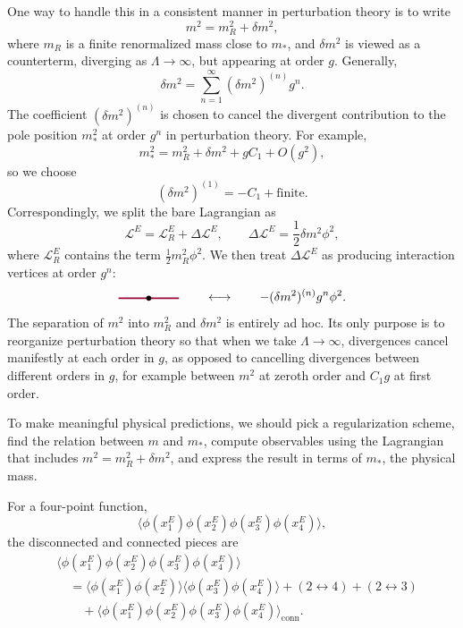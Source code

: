 One way to handle this in a consistent manner in perturbation theory is to
write
\[
  m^2=m_R^2+\delta m^2,
\]
where \(m_R\) is a finite renormalized mass close to \(m_*\), and
\(\delta m^2\) is viewed as a counterterm, diverging as
\(\Lambda\to\infty\), but appearing at order \(g\). Generally,
\[
  \delta m^2=\sum_{n=1}^{\infty}(\delta m^2)^{(n)}g^n .
\]
The coefficient \((\delta m^2)^{(n)}\) is chosen to cancel the divergent
contribution to the pole position \(m_*^2\) at order \(g^n\) in perturbation
theory. For example,
\[
  m_*^2=m_R^2+\delta m^2+gC_1+O(g^2),
\]
so we choose
\[
  (\delta m^2)^{(1)}=-C_1+\text{finite}.
\]
Correspondingly, we split the bare Lagrangian as
\[
  \mathcal L^E
  =
  \mathcal L_R^E+\Delta\mathcal L^E,
  \qquad
  \Delta\mathcal L^E=\frac12\delta m^2\phi^2,
\]
where \(\mathcal L_R^E\) contains the term \(\frac12m_R^2\phi^2\). We then
treat \(\Delta\mathcal L^E\) as producing interaction vertices at order
\(g^n\):
\[
\begin{tikzpicture}[baseline=-0.45ex, scale=0.85]
  \draw[purple!80!black, very thick] (-1,0)--(1,0);
  \fill (0,0) circle (2.4pt);
\end{tikzpicture}
\qquad\longleftrightarrow\qquad
-(\delta m^2)^{(n)}g^n\phi^2 .
\]
The separation of \(m^2\) into \(m_R^2\) and \(\delta m^2\) is entirely ad hoc.
Its only purpose is to reorganize perturbation theory so that when we take
\(\Lambda\to\infty\), divergences cancel manifestly at each order in \(g\), as
opposed to cancelling divergences between different orders in \(g\), for
example between \(m^2\) at zeroth order and \(C_1g\) at first order.

To make meaningful physical predictions, we should pick a regularization
scheme, find the relation between \(m\) and \(m_*\), compute observables using
the Lagrangian that includes \(m^2=m_R^2+\delta m^2\), and express the result
in terms of \(m_*\), the physical mass.

For a four-point function,
\[
  \langle
    \phi(x_1^E)\phi(x_2^E)\phi(x_3^E)\phi(x_4^E)
  \rangle,
\]
the disconnected and connected pieces are
\[
\begin{aligned}
  &\langle
    \phi(x_1^E)\phi(x_2^E)\phi(x_3^E)\phi(x_4^E)
  \rangle  \\
  &\quad =
  \langle\phi(x_1^E)\phi(x_2^E)\rangle
  \langle\phi(x_3^E)\phi(x_4^E)\rangle
  +(2\leftrightarrow 4)
  +(2\leftrightarrow 3)  \\
  &\qquad
  +
  \langle
    \phi(x_1^E)\phi(x_2^E)\phi(x_3^E)\phi(x_4^E)
  \rangle_{\mathrm{conn}} .
\end{aligned}
\]

